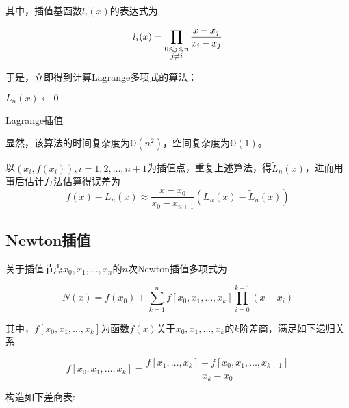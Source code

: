\documentclass[degree=report, output=electronic]{ustcthesis}
\begin{document}
其中，插值基函数$l_i(x)$的表达式为

\begin{equation}
  l_i(x)=\prod_{\begin{subarray}{c}0\le j\le n\\j\neq i\end{subarray}}\frac{x-x_j}{x_i-x_j}
\end{equation}

于是，立即得到计算Lagrange多项式的算法：

\begin{algorithm}[h]
  \SetAlgoLined
  
  $L_n(x)\leftarrow 0$\;
  \caption{Lagrange插值}
  \label{algo:lagrange}
\end{algorithm}

显然，该算法的时间复杂度为$\mathbb{O}(n^2)$，空间复杂度为$\mathbb{O}(1)$。

以$(x_i,f(x_i)),i=1,2,\dots,n+1$为插值点，重复上述算法，得$\tilde{L}_n(x)$，进而用事后估计方法估算得误差为
\begin{equation}
  f(x)-L_n(x)\approx \frac{x-x_0}{x_0-x_{n+1}}(L_n(x)-\tilde{L}_n(x))
\end{equation}

\newpage

\subsection{Newton插值}

关于插值节点$x_0,x_1,\dots,x_n$的$n$次Newton插值多项式为

\begin{equation}
  N(x)=f(x_0)+\sum_{k=1}^{n}f[x_0,x_1,\dots,x_k]\prod_{i=0}^{k-1}(x-x_i)
\end{equation}

其中，$f[x_0,x_1,\dots,x_k]$为函数$f(x)$关于$x_0,x_1,\dots,x_k$的$k$阶差商，满足如下递归关系

\begin{equation}
  f[x_0,x_1,\dots,x_k]=\frac{f[x_1,\dots,x_k]-f[x_0,x_1,\dots,x_{k-1}]}{x_k-x_0}
\end{equation}

构造如下差商表:
\end{document}

